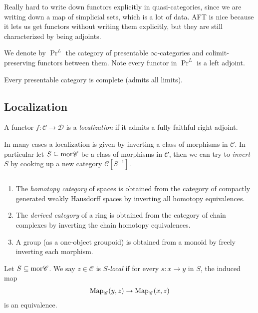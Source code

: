 \documentclass[11pt]{amsart}
\begin{document}
Really hard to write down functors explicitly in quasi-categories, since we are writing down a map of simplicial sets, which is a lot of data. AFT is nice because it lets us get functors without writing them explicitly, but they are still characterized by being adjoints.

\begin{notation}\label{nota:PrL}  We denote by $\Pr^L$ the category of presentable $\infty$-categories and colimit-preserving functors between them. Note every functor in $\Pr^L$ is a left adjoint.
\end{notation}

\begin{theorem} Every presentable category is complete (admits all limits).
\end{theorem}


\subsection{Localization}

\begin{definition} \cite[5.2.7.2]{HTT} A functor $f \colon \mathscr{C}\to \mathscr{D}$ is a \textit{localization} if it admits a fully faithful right adjoint.
\end{definition}

In many cases a localization is given by inverting a class of morphisms in $\mathscr{C}$. In particular let $S \subseteq \mathrm{mor} \mathscr{C}$ be a class of morphisms in $\mathscr{C}$, then we can try to \textit{invert} $S$ by cooking up a new category $\mathscr{C}[S^{-1}]$.

\begin{example} $\ $
\begin{enumerate}
    \item The \textit{homotopy category} of spaces is obtained from the category of compactly generated weakly Hausdorff spaces by inverting all homotopy equivalences.
    \item The \textit{derived category} of a ring is obtained from the category of chain complexes by inverting the chain homotopy equivalences.
    \item A group (as a one-object groupoid) is obtained from a monoid by freely inverting each morphism.
\end{enumerate}
\end{example}



\begin{definition} \cite[5.5.4.1]{HTT} Let $S \subseteq \mathrm{mor} \mathscr{C}$. We say $z\in \mathscr{C}$ is $S$\textit{-local} if for every $s \colon x \to y$ in $S$, the induced map
\begin{align*}
    \mathrm{Map}_{\mathscr{C}}(y,z) \to \mathrm{Map}_{\mathscr{C}}(x,z)
\end{align*}
is an equivalence.
\end{definition}
\end{document}
